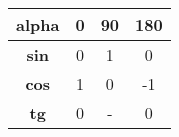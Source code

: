 \begin{table}[]
\begin{tabular}{| c | c | c | c |}
\hline
\textbf{alpha} & \textbf{0} & \textbf{90} & \textbf{180} \\
\hline
\textbf{sin}   & 0          & 1           & 0            \\
\hline
\textbf{cos}   & 1          & 0           & -1           \\
\hline
\textbf{tg}    & 0          & -           & 0          \\
\hline
\end{tabular}
\label{tab:sincostg}
\end{table}

